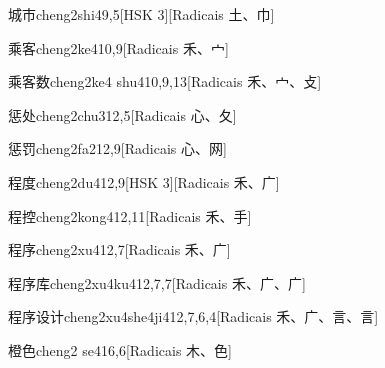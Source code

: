 \begin{entry}{城市}{cheng2shi4}{9,5}[HSK 3][Radicais ⼟、⼱]
\end{entry}

\begin{entry}{乘客}{cheng2ke4}{10,9}[Radicais ⽲、⼧]
\end{entry}

\begin{entry}{乘客数}{cheng2ke4 shu4}{10,9,13}[Radicais ⽲、⼧、⽁]
\end{entry}

\begin{entry}{惩处}{cheng2chu3}{12,5}[Radicais ⼼、⼡]
\end{entry}

\begin{entry}{惩罚}{cheng2fa2}{12,9}[Radicais ⼼、⽹]
\end{entry}

\begin{entry}{程度}{cheng2du4}{12,9}[HSK 3][Radicais ⽲、⼴]
\end{entry}

\begin{entry}{程控}{cheng2kong4}{12,11}[Radicais ⽲、⼿]
\end{entry}

\begin{entry}{程序}{cheng2xu4}{12,7}[Radicais ⽲、⼴]
\end{entry}

\begin{entry}{程序库}{cheng2xu4ku4}{12,7,7}[Radicais ⽲、⼴、⼴]
\end{entry}

\begin{entry}{程序设计}{cheng2xu4she4ji4}{12,7,6,4}[Radicais ⽲、⼴、⾔、⾔]
\end{entry}

\begin{entry}{橙色}{cheng2 se4}{16,6}[Radicais ⽊、⾊]
\end{entry}

